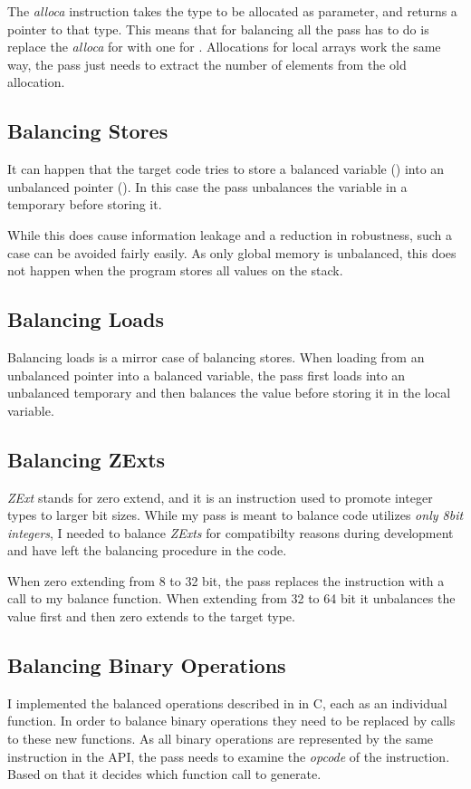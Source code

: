 The \emph{alloca} instruction takes the type to be allocated as parameter, and returns a pointer to that type.
This means that for balancing all the pass has to do is replace the \emph{alloca} for  with one for .
Allocations for local arrays work the same way, the pass just needs to extract the number of elements from the old allocation.

\subsection{Balancing Stores}
It can happen that the target code tries to store a balanced variable () into an unbalanced pointer ().
In this case the pass unbalances the variable in a temporary before storing it.

While this does cause information leakage and a reduction in robustness, such a case can be avoided fairly easily.
As only global memory is unbalanced, this does not happen when the program stores all values on the stack.

\subsection{Balancing Loads}
Balancing loads is a mirror case of balancing stores.
When loading from an unbalanced pointer into a balanced variable, the pass first loads into an unbalanced temporary and then balances the value before storing it in the local variable.

\subsection{Balancing ZExts}
\emph{ZExt} stands for zero extend, and it is an instruction used to promote integer types to larger bit sizes.
While my pass is meant to balance code utilizes \emph{only 8bit integers}, I needed to balance \emph{ZExts} for compatibilty reasons during development and have left the balancing procedure in the code.

When zero extending from 8 to 32 bit, the pass replaces the instruction with a call to my balance function.
When extending from 32 to 64 bit it unbalances the value first and then zero extends to the target type.

\subsection{Balancing Binary Operations}
I implemented the balanced operations described in  in C, each as an individual function.
In order to balance binary operations they need to be replaced by calls to these new functions.
As all binary operations are represented by the same instruction in the \llvm{} API, the pass needs to examine the \emph{opcode} of the instruction.
Based on that it decides which function call to generate.

